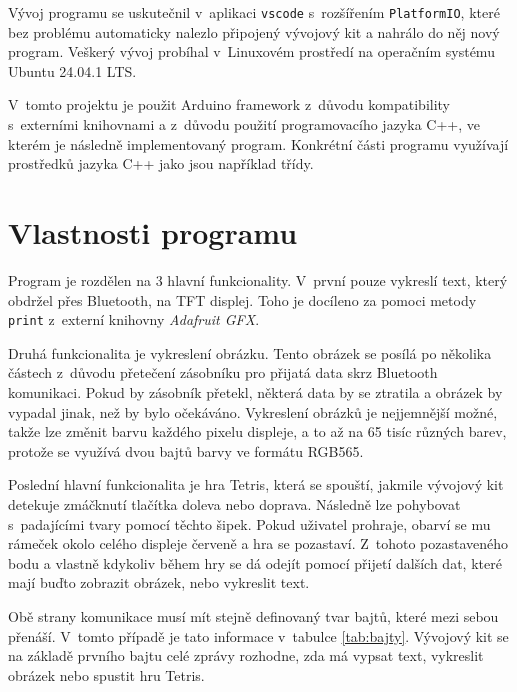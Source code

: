 Vývoj programu se uskutečnil v~aplikaci \texttt{vscode} s~rozšířením \texttt{PlatformIO}, které bez problému automaticky nalezlo připojený vývojový kit a nahrálo do něj nový program. Veškerý vývoj probíhal v~Linuxovém prostředí na operačním systému Ubuntu 24.04.1 LTS.

V~tomto projektu je použit Arduino framework z~důvodu kompatibility s~externími knihovnami a z~důvodu použití programovacího jazyka C++, ve kterém je následně implementovaný program. Konkrétní části programu využívají prostředků jazyka C++ jako jsou například třídy.

\chapter{Vlastnosti programu}

Program je rozdělen na 3 hlavní funkcionality. V~první pouze vykreslí text, který obdržel přes Bluetooth, na TFT displej. Toho je docíleno za pomoci metody \texttt{print} z~externí knihovny \textit{Adafruit GFX}.

Druhá funkcionalita je vykreslení obrázku. Tento obrázek se posílá po několika částech z~důvodu přetečení zásobníku pro přijatá data skrz Bluetooth komunikaci. Pokud by zásobník přetekl, některá data by se ztratila a obrázek by vypadal jinak, než by bylo očekáváno. Vykreslení obrázků je nejjemnější možné, takže lze změnit barvu každého pixelu displeje, a to až na 65 tisíc různých barev, protože se využívá dvou bajtů barvy ve formátu RGB565.

Poslední hlavní funkcionalita je hra Tetris, která se spouští, jakmile vývojový kit detekuje zmáčknutí tlačítka doleva nebo doprava. Následně lze pohybovat s~padajícími tvary pomocí těchto šipek. Pokud uživatel prohraje, obarví se mu rámeček okolo celého displeje červeně a hra se pozastaví. Z~tohoto pozastaveného bodu a vlastně kdykoliv během hry se dá odejít pomocí přijetí dalších dat, které mají buďto zobrazit obrázek, nebo vykreslit text.

Obě strany komunikace musí mít stejně definovaný tvar bajtů, které mezi sebou přenáší. V~tomto případě je tato informace v~tabulce \ref{tab:bajty}. Vývojový kit se na základě prvního bajtu celé zprávy rozhodne, zda má vypsat text, vykreslit obrázek nebo spustit hru Tetris.


